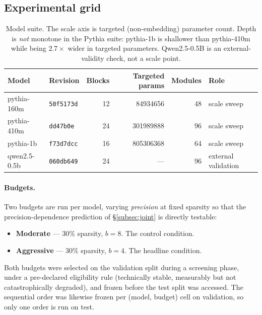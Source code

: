 \subsection{Experimental grid}
\label{subsec:grid}

\begin{table}[t]
\centering
\caption{Model suite. The scale axis is targeted (non-embedding) parameter count. Depth is
\emph{not} monotone in the Pythia suite: pythia-1b is shallower than pythia-410m while being
$2.7\times$ wider in targeted parameters. Qwen2.5-0.5B is an external-validity check, not a
scale point.}
\label{tab:models}
\begin{tabular}{@{}llrrrl@{}}
\toprule
\textbf{Model} & \textbf{Revision} & \textbf{Blocks} & \textbf{Targeted params} & \textbf{Modules} & \textbf{Role} \\
\midrule
pythia-160m    & \texttt{50f5173d} & 12 & \num{84934656}  & 48 & scale sweep \\
pythia-410m    & \texttt{dd47b0e}  & 24 & \num{301989888} & 96 & scale sweep \\
pythia-1b      & \texttt{f73d7dcc} & 16 & \num{805306368} & 64 & scale sweep \\
\midrule
qwen2.5-0.5b   & \texttt{060db649} & 24 & ---             & 96 & external validation \\
\bottomrule
\end{tabular}
\end{table}

\paragraph{Budgets.} Two budgets are run per model, varying \emph{precision} at fixed
sparsity so that the precision-dependence prediction of \S\ref{subsec:joint} is directly
testable:

\begin{itemize}
  \item \textbf{Moderate} --- $30\%$ sparsity, $b{=}8$. The control condition.
  \item \textbf{Aggressive} --- $30\%$ sparsity, $b{=}4$. The headline condition.
\end{itemize}

Both budgets were selected on the validation split during a screening phase, under a
pre-declared eligibility rule (technically stable, measurably but not catastrophically
degraded), and frozen before the test split was accessed. The sequential order was likewise
frozen per (model, budget) cell on validation, so only one order is run on test.


